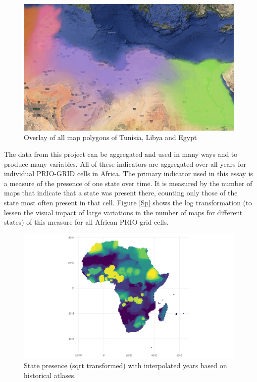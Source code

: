 \documentclass[12pt]{article}
\begin{document}
\begin{figure}[!htb]
	\includegraphics[width=\textwidth,keepaspectratio]{../TUNLIBEGY.pdf}
	\caption{Overlay of all map polygons of Tunisia, Libya and Egypt}
	\label{overlay}
\end{figure}

The data from this project can be aggregated and used in many ways and to
produce many variables. All of these indicators are aggregated over all years
for individual PRIO-GRID cells in Africa. The primary indicator used in this
essay is a measure of the presence of one state over time. It is measured by the
number of maps that indicate that a state was present there, counting only those
of the state most often present in that cell. Figure \ref{Sp} shows the log
transformation (to lessen the visual impact of large variations in the number of
maps for different states) of this measure for all African PRIO grid cells.

\begin{figure}[htpb]
	\centering
	\includegraphics[width=\linewidth]{../R/Output/sp_os_i_sum_any_plot.pdf}
	\caption{State presence (sqrt transformed) with interpolated years based
	on historical atlases.}
	\label{Sp_i}
\end{figure}
\end{document}
